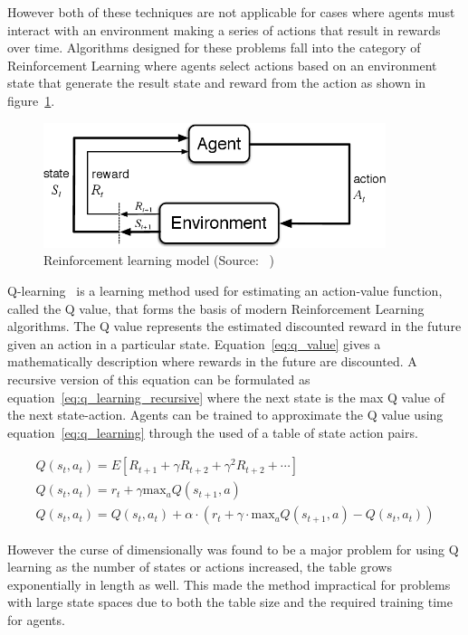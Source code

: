 However both of these techniques are not applicable for cases where agents must interact with an environment making a
series of actions that result in rewards over time. Algorithms designed for these problems fall into the category of
Reinforcement Learning where agents select actions based on an environment state that generate the result state and
reward from the action as shown in figure~\ref{fig:reinforcement_learning}.

\begin{figure}[h]
    \centering
    \includegraphics[width=10cm]{figures/1_background_lit_figs/agent_env_interaction.png}
    \caption{Reinforcement learning model (Source: ~\cite{Sutton1998})}
    \label{fig:reinforcement_learning}
\end{figure}

Q-learning~\citep{watkins1992q-learning} is a learning method used for estimating an action-value function,
called the Q value, that forms the basis of modern Reinforcement Learning algorithms. The Q value represents the
estimated discounted reward in the future given an action in a particular state. Equation~\eqref{eq:q_value} gives a
mathematically description where rewards in the future are discounted. A recursive version of this equation can be
formulated as equation~\eqref{eq:q_learning_recursive} where the next state is the max Q value of the next state-action.
Agents can be trained to approximate the Q value using equation~\eqref{eq:q_learning} through the used of a table
of state action pairs.

\begin{align}
    Q(s_t, a_t) = E[R_{t+1} + \gamma R_{t+2} + \gamma^2 R_{t+2} + \cdots ] \label{eq:q_value} \\
    Q(s_t, a_t) = r_t + \gamma \text{max}_a Q(s_{t+1} , a) \label{eq:q_learning_recursive} \\
    Q(s_t, a_t) = Q(s_t, a_t) + \alpha \cdot (r_t + \gamma \cdot \text{max}_a Q(s_{t+1} , a) - Q(s_t, a_t) ) \label{eq:q_learning}
\end{align}

However the curse of dimensionally was found to be a major problem for using Q learning as the number of states
or actions increased, the table grows exponentially in length as well. This made the method impractical for problems
with large state spaces due to both the table size and the required training time for agents.

